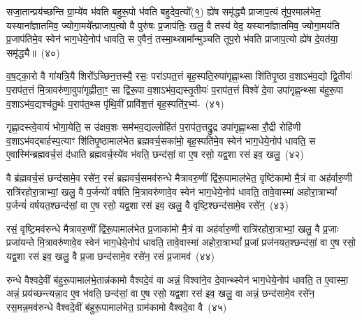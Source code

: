 सजा॒तान्प्रय॑च्छन्ति ग्रा॒म्ये॑व भ॑वति बहुरू॒पो भ॑वति बहुदेव॒त्यो᳚(१॒) ह्ये॑ष समृ॑द्ध्यै प्राजाप॒त्यं तू॑प॒रमा\-ल॑भेत॒ यस्याना᳚ज्ञातमिव॒ ज्योगा॒मये᳚त्प्राजाप॒त्यो वै पुरु॑षः प्र॒जा\-प॑तिः॒ खलु॒ वै तस्य॑ वेद॒ यस्याना᳚ज्ञातमिव॒ ज्योगा॒मय॑ति प्र॒जा\-प॑तिमे॒व स्वेन॑ भाग॒धेये॒नोप॑ धावति॒ स ए॒वैनं॒ तस्मा॒थ्स्रामा᳚न्मुञ्चति तूप॒रो भ॑वति प्राजाप॒त्यो ह्ये॑ष दे॒वत॑या॒ समृ॑द्ध्यै॥~(४०)\ip

{\anuvakamend[{अ॒स्मा॒ इन्द्र॑मे॒वैष स॑जा॒ता विश्वा॑ने॒व दे॒वान्थ्स्वेन॑ भाग॒धेये॒नोप॑ धावति॒ त ए॒वास्मै᳚ प्राजाप॒त्यो हि त्रीणि॑ च}]}%

व॒ष॒ट्का॒रो वै गा॑यत्रि॒यै शिरो᳚\-ऽच्छिन॒त्तस्यै॒ रसः॒ परा॑\-ऽपत॒त्तं बृह॒स्पति॒रुपा॑गृह्णा॒थ्सा शि॑तिपृ॒ष्ठा व॒शा\-ऽभ॑व॒द्यो द्वि॒तीयः॑ प॒राप॑त॒त्तं मि॒त्रावरु॑णा॒वुपा॑गृह्णीता॒ꣳ॒ सा द्वि॑रू॒पा व॒शा\-ऽभ॑व॒द्यस्तृ॒तीयः॑ प॒राप॑त॒त्तं विश्वे॑ दे॒वा उपा॑गृह्ण॒न्थ्सा ब॑हुरू॒पा व॒शा\-ऽभ॑व॒द्यश्च॑तु॒र्थः प॒राप॑त॒थ्स पृ॑थि॒वीं प्रावि॑श॒त्तं बृह॒स्पति॑र॒भ्य॑-~(४१)\ip

गृह्णा॒दस्त्वे॒वायं भोगा॒येति॒ स उ॑क्षव॒शः सम॑भव॒द्यल्लोहि॑तं प॒राप॑त॒त्तद्रु॒द्र उपा॑गृह्णा॒थ्सा रौ॒द्री रोहि॑णी व॒शा\-ऽभ॑व\-द्बार्\mbox{}हस्प॒त्याꣳ शि॑तिपृ॒ष्ठामाल॑भेत ब्रह्मवर्च॒सका॑मो॒ बृह॒स्पति॑मे॒व स्वेन॑ भाग॒धेये॒नोप॑ धावति॒ स ए॒वास्मि॑न्ब्रह्म\-वर्च॒सं द॑धाति ब्रह्मवर्च॒स्ये॑व भ॑वति॒ छन्द॑सां॒ वा ए॒ष रसो॒ यद्व॒शा रस॑ इव॒ खलु॒~(४२)\ip

वै ब्र॑ह्मवर्च॒सं छन्द॑सामे॒व रसे॑न॒ रसं॑ ब्रह्मवर्च॒समव॑\-रुन्धे मैत्रावरु॒णीं द्वि॑रू॒पामा\-ल॑भेत॒ वृष्टि॑कामो मै॒त्रं वा अह॑र्वारु॒णी रात्रि॑रहोरा॒त्राभ्यां॒ खलु॒ वै प॒र्जन्यो॑ वर्\mbox{}षति मि॒त्रावरु॑णावे॒व स्वेन॑ भाग॒धेये॒नोप॑ धावति॒ तावे॒वास्मा॑ अहोरा॒त्रा\-भ्यां᳚ प॒र्जन्यं॑ वर्\mbox{}षयत॒श्छन्द॑सां॒ वा ए॒ष रसो॒ यद्व॒शा रस॑ इव॒ खलु॒ वै वृष्टि॒श्छन्द॑सामे॒व रसे॑न॒~(४३)\ip

रसं॒ वृष्टि॒मव॑\-रुन्धे मैत्रावरु॒णीं द्वि॑रू॒पामाल॑भेत प्र॒जाका॑मो मै॒त्रं वा अह॑र्वारु॒णी रात्रि॑रहोरा॒त्राभ्यां॒ खलु॒ वै प्र॒जाः प्रजा॑यन्ते मि॒त्रावरु॑णावे॒व स्वेन॑ भाग॒धेये॒नोप॑ धावति॒ तावे॒वास्मा॑ अहोरा॒त्रा\-भ्यां᳚ प्र॒जां प्रज॑नयत॒श्छन्द॑सां॒ वा ए॒ष रसो॒ यद्व॒शा रस॑ इव॒ खलु॒ वै प्र॒जा छन्द॑सामे॒व रसे॑न॒ रसं॑ प्र॒जामव॑~(४४)\ip

रुन्धे वैश्वदे॒वीं ब॑हुरू॒पामाल॑भे॒तान्न॑कामो वैश्वदे॒वं वा अन्नं॒ विश्वा॑ने॒व दे॒वान्थ्स्वेन॑ भाग॒धेये॒नोप॑ धावति॒ त ए॒वास्मा॒ अन्नं॒ प्रय॑च्छन्त्यन्ना॒द ए॒व भ॑वति॒ छन्द॑सां॒ वा ए॒ष रसो॒ यद्व॒शा रस॑ इव॒ खलु॒ वा अन्नं॒ छन्द॑सामे॒व रसे॑न॒ रस॒मन्न॒मव॑\-रुन्धे वैश्वदे॒वीं ब॑हुरू॒पामा\-ल॑भेत॒ ग्राम॑कामो वैश्वदे॒वा वै~(४५)\ip

